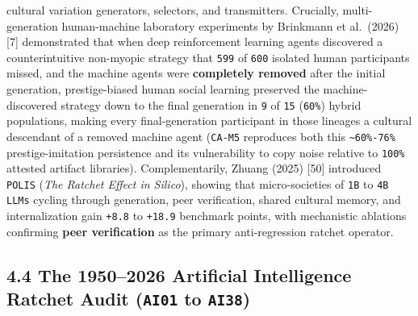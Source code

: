 \documentclass[10pt,letterpaper]{article}
\begin{document}
\begin{enumerate}
  cultural variation generators, selectors, and transmitters. Crucially,
  multi-generation human-machine laboratory experiments by Brinkmann et
  al.~(2026) {[}7{]} demonstrated that when deep reinforcement learning
  agents discovered a counterintuitive non-myopic strategy that
  \texttt{599} of \texttt{600} isolated human participants missed, and
  the machine agents were \textbf{completely removed} after the initial
  generation, prestige-biased human social learning preserved the
  machine-discovered strategy down to the final generation in \texttt{9}
  of \texttt{15} (\texttt{60\%}) hybrid populations, making every
  final-generation participant in those lineages a cultural descendant
  of a removed machine agent (\texttt{CA-M5} reproduces both this
  \texttt{\textasciitilde{}60\%-76\%} prestige-imitation persistence and
  its vulnerability to copy noise relative to \texttt{100\%} attested
  artifact libraries). Complementarily, Zhuang (2025) {[}50{]}
  introduced \texttt{POLIS} (\emph{The Ratchet Effect in Silico}),
  showing that micro-societies of \texttt{1B} to \texttt{4B}
  \texttt{LLMs} cycling through generation, peer verification, shared
  cultural memory, and internalization gain \texttt{+8.8} to
  \texttt{+18.9} benchmark points, with mechanistic ablations confirming
  \textbf{peer verification} as the primary anti-regression ratchet
  operator.
\end{enumerate}

\subsection{\texorpdfstring{4.4 The 1950--2026 Artificial Intelligence
Ratchet Audit (\texttt{AI01} to
\texttt{AI38})}{4.4 The 1950--2026 Artificial Intelligence Ratchet Audit (AI01 to AI38)}}\label{the-19502026-artificial-intelligence-ratchet-audit-ai01-to-ai38}
\end{document}
